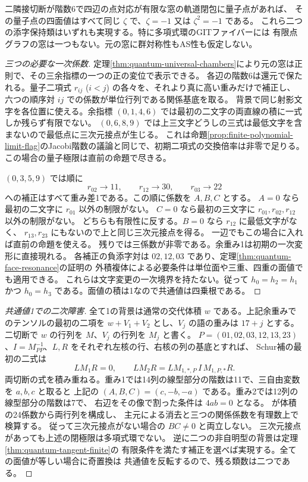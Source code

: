 \begin{theorem}\label{thm:finite-quantum-closed-limits}
二隣接切断が階数6で四辺の点対応が有限な窓の軌道閉包に量子点があれば、
その量子点の四面値はすべて同じ $\zeta$ で、$\zeta=-1$ 又は $\zeta^2=-1$ である。
これら二つの添字保持類はいずれも実現する。特に多項式環のGITファイバーには
有限点グラフの窓は一つもない。元の窓に群対称性もAS性も仮定しない。
\end{theorem}
\begin{proof}[三つの必要な一次係数]
定理\ref{thm:quantum-universal-chambers}により元の窓は正則で、その三余指標の一つの正の変位で表示できる。
各辺の階数6は還元で保たれる。量子二項式 $r_{ij}$ ($i<j$) の各々を、それより真に高い重みだけで補正し、
六つの順序対 $ij$ での係数が単位行列である関係基底を取る。
背景で同じ射影文字を各位置に使える。余指標 $(0,1,4,6)$ では最初の二文字の両直線の積に一式しか残らず有限でない。
$(0,6,8,9)$ では上三文字どうしの三式は最低文字を含まないので最低点に三次元接点が生じる。
これは命題\ref{prop:finite-polynomial-limit-flag}のJacobi階数の議論と同じで、初期二項式の交換倍率は非零で足りる。
この場合の量子極限は直前の命題で尽きる。

$(0,3,5,9)$ では順に
\[
  r_{02}\longrightarrow 11,\qquad r_{12}\longrightarrow30,\qquad
  r_{03}\longrightarrow22
\]
への補正はすべて重み差1である。この順に係数を $A,B,C$ とする。
$A=0$ なら最初の二文字に $r_{01}$ 以外の制限がない。
$C=0$ なら最初の三文字に $r_{01},r_{02},r_{12}$ 以外の制限がない。
どちらも有限性に反する。$B=0$ なら $r_{12}$ に最低文字がなく、
$r_{13},r_{23}$ にもないので上と同じ三次元接点を得る。
一辺でもこの場合に入れば直前の命題を使える。
残りでは三係数が非零である。余重み1は初期の一次変形に直接現れる。
各補正の負添字対は $02,12,03$ であり、定理\ref{thm:quantum-face-resonance}の証明の
外積複体による必要条件は単位面や三重、四重の面値でも適用できる。
これらは文字変更の一次境界を持たない。従って
$h_0=h_2=h_1$ かつ $h_0=h_3$ である。面値の積は1なので共通値は四乗根である。
\end{proof}

\begin{proof}[共通値1での二次障害]
全て1の背景は通常の交代体積 $w$ である。上記余重みでのテンソルの最初の二項を
$w+V_1+V_2$ とし、$V_j$ の語の重みは $17+j$ とする。
二切断で $w$ の行列を $M$、$V_j$ の行列を $M_j$ と書く。
$P=(01,02,03,12,13,23)$、$I=M_{PP}^{-1}$、$L,R$ をそれぞれ左核の行、右核の列の基底とすれば、
Schur補の最初の二式は
\[
   L M_1 R=0,\qquad L M_2 R=L M_{1,*,P}\, I\,M_{1,P,*} R .
\]
両切断の式を積み重ねる。重み1では14列の線型部分の階数は11で、三自由変数を $a,b,c$ と取ると
上記の $(A,B,C)=(c,-b,-a)$ である。重み2では12列の線型部分の階数は7で、
右辺をその像で割った条件は $4ab=0$ となる。
 が体積の24係数から両行列を構成し、
主元による消去と三つの関係係数を有理数上で検算する。
従って三次元接点がない場合の $BC\ne0$ と両立しない。
三次元接点があっても上述の閉極限は多項式環でない。
逆に二つの非自明型の背景は定理\ref{thm:quantum-tangent-finite}の
有限条件を満たす補正を選べば実現する。全ての面値が等しい場合に奇置換は
共通値を反転するので、残る類数は二つである。
\end{proof}
